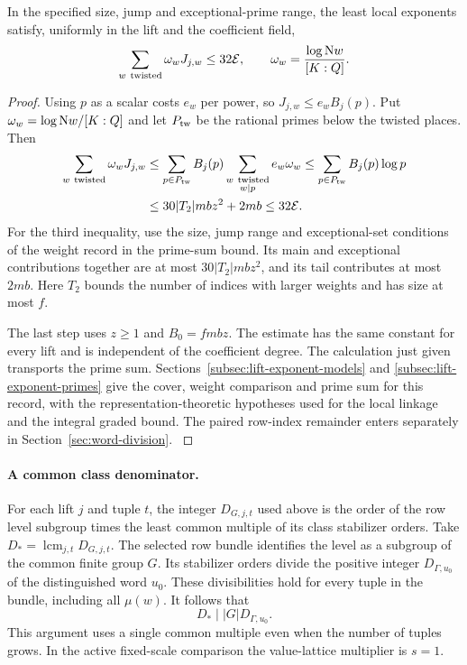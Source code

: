 \begin{lemma}
In the specified size, jump and exceptional-prime range,
the least local exponents satisfy, uniformly in the lift and the coefficient field,
\[
 \sum_{w\ {\rm twisted}}\omega_wJ_{j,w}\le32\mathcal E,\qquad\omega_w=\frac{\log\mathrm Nw}{[K:\mathbb Q]}.
\]
\end{lemma}
\begin{proof}
Using \(p\) as a scalar costs \(e_w\) per power, so
\(J_{j,w}\le e_w B_j(p)\). Put \(\omega_w=\log\mathrm Nw/[K:\Q]\)
and let \(P_{\rm tw}\) be the rational primes below the
twisted places. Then
\begin{align}
 \sum_{w\ {\rm twisted}}\omega_w J_{j,w}
 &\le\sum_{p\in P_{\rm tw}}B_j(p)
            \sum_{\substack{w\ {\rm twisted}\\ w\mid p}}e_w\omega_w
 \le\sum_{p\in P_{\rm tw}}B_j(p)\log p \notag\\
 &\le 30|T_2|mbz^2+2mb
 \le32\mathcal E . \label{eq:division-least-sum}
\end{align} For the third inequality, use the size, jump range and exceptional-set conditions of the weight record in the prime-sum bound. Its
main and exceptional contributions together are at most
\(30|T_2|mbz^2\), and its tail contributes at most \(2mb\).
Here \(T_2\) bounds the number of indices with larger weights and has
size at most \(f\).

The last step uses \(z\ge1\) and
\(B_0=fmbz\). The estimate has the same constant
for every lift and is independent of the
coefficient degree. The calculation just given transports the prime sum.
Sections~\ref{subsec:lift-exponent-models} and
\ref{subsec:lift-exponent-primes} give the cover, weight
comparison and prime sum for this record, with the
representation-theoretic hypotheses used for the local linkage
and the integral graded bound. The paired row-index remainder
enters separately in Section~\ref{sec:word-division}.
\label{cor:division-length-8}

\end{proof}



\paragraph{A common class denominator.}
For each lift \(j\) and tuple \(t\), the integer \(D_{G,j,t}\)
used above is the order of the row level subgroup times the
least common multiple of its class stabilizer orders. Take
\(D_*=\operatorname{lcm}_{j,t}D_{G,j,t}\).
The selected row bundle identifies the level as a subgroup of
the common finite group \(G\). Its stabilizer orders divide
the positive integer \(D_{\Gamma,u_0}\) of the distinguished
word \(u_0\). These divisibilities hold for every tuple in the
bundle, including all \(\mu(w)\). It follows that
\[
                   D_*\mid |G|D_{\Gamma,u_0}.
\]
This argument uses a single common multiple even when the
number of tuples grows. In the active fixed-scale comparison
the value-lattice multiplier is \(s=1\).

